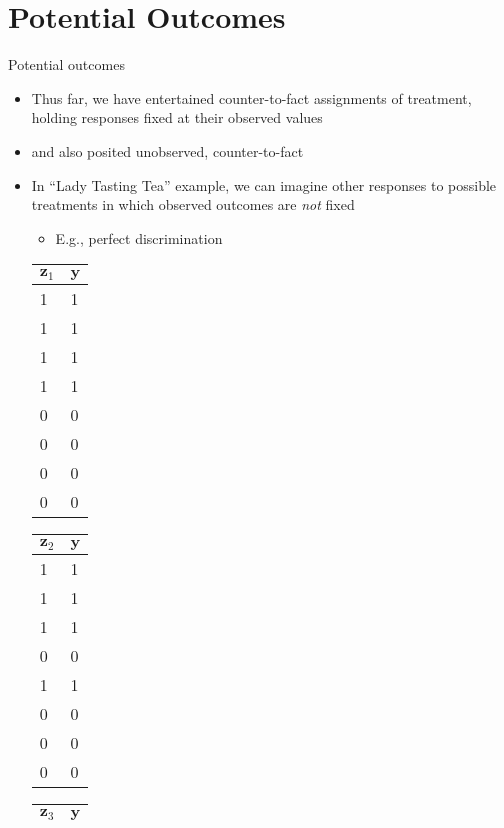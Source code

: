 \documentclass[table, xcolor = {dvipsnames}, 9pt]{beamer}
\theoremstyle{plain}
\newcommand{\mh}[1]{{\color{magenta}{#1}}}
\begin{document}
\section{Potential Outcomes}
\begin{frame}{Potential outcomes}
\vfill
\begin{itemize} \vfill
\item Thus far, we have entertained counter-to-fact assignments of treatment, holding responses fixed at their observed values \vfill
\item \citet{neyman1923} and \citet{rubin1974} also posited unobserved, counter-to-fact \mh{potential outcomes} \vfill
\item In ``Lady Tasting Tea'' example, we can imagine other responses to possible treatments in which observed outcomes are \textit{not} fixed \vfill
\begin{itemize} \vfill
\item E.g., perfect discrimination \vfill
\end{itemize} \vfill
\vspace{2em}
\begin{table}[H]
\scriptsize
    \begin{tabular}{l|l}
    \toprule
    $\mathbf{z}_1$ & $\mathbf{y}$ \\ \midrule
    1 & 1  \\
    1 & 1   \\
    1 & 1   \\
    1 & 1  \\
    0 & 0  \\
    0 & 0  \\
    0 & 0  \\
    0 & 0  
    \end{tabular}
    \hfill
      \begin{tabular}{l|l}
      \toprule
    $\mathbf{z}_2$ & $\mathbf{y}$ \\ \midrule
    1 &  1  \\
    1 &  1  \\
    1 &  1  \\
    0 &  0   \\
    1 &  1  \\
    0 &  0  \\
    0 &  0  \\
    0 &  0  
    \end{tabular}
     \hfill
      \begin{tabular}{l|l}
      \toprule
    $\mathbf{z}_3$ & $\mathbf{y}$ \\ \midrule

\end{tabular}
\end{table}
\end{itemize}
\end{frame}
\end{document}
